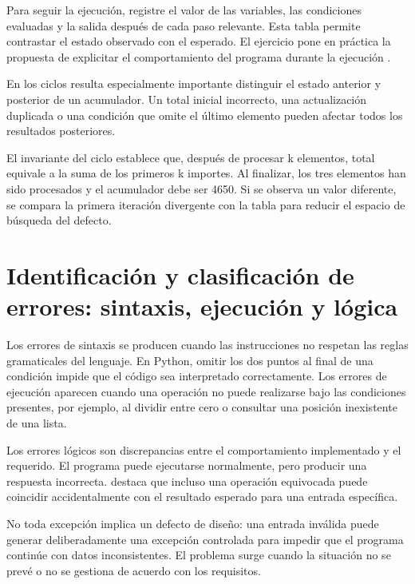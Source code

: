 Para seguir la ejecución, registre el valor de las variables, las condiciones evaluadas y la salida después de cada paso relevante. Esta tabla permite contrastar el estado observado con el esperado. El ejercicio pone en práctica la propuesta de explicitar el comportamiento del programa durante la ejecución \parencite{sorva2013}.

En los ciclos resulta especialmente importante distinguir el estado anterior y posterior de un acumulador. Un total inicial incorrecto, una actualización duplicada o una condición que omite el último elemento pueden afectar todos los resultados posteriores.




El invariante del ciclo establece que, después de procesar k elementos, total equivale a la suma de los primeros k importes. Al finalizar, los tres elementos han sido procesados y el acumulador debe ser 4650. Si se observa un valor diferente, se compara la primera iteración divergente con la tabla para reducir el espacio de búsqueda del defecto.

\section{Identificación y clasificación de errores: sintaxis, ejecución y lógica}

Los errores de sintaxis se producen cuando las instrucciones no respetan las reglas gramaticales del lenguaje. En Python, omitir los dos puntos al final de una condición impide que el código sea interpretado correctamente. Los errores de ejecución aparecen cuando una operación no puede realizarse bajo las condiciones presentes, por ejemplo, al dividir entre cero o consultar una posición inexistente de una lista.

Los errores lógicos son discrepancias entre el comportamiento implementado y el requerido. El programa puede ejecutarse normalmente, pero producir una respuesta incorrecta. \textcite[p.~13]{farrell2013} destaca que incluso una operación equivocada puede coincidir accidentalmente con el resultado esperado para una entrada específica.

No toda excepción implica un defecto de diseño: una entrada inválida puede generar deliberadamente una excepción controlada para impedir que el programa continúe con datos inconsistentes. El problema surge cuando la situación no se prevé o no se gestiona de acuerdo con los requisitos.

